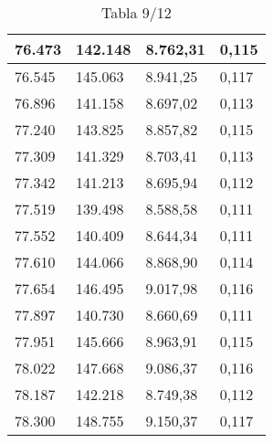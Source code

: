 \begin{table}[H]
{\begin{tabular}{| l | l | l |l |}
76.473	&	142.148	&	8.762,31	&	0,115	\\ \hline
76.545	&	145.063	&	8.941,25	&	0,117	\\ \hline
76.896	&	141.158	&	8.697,02	&	0,113	\\ \hline
77.240	&	143.825	&	8.857,82	&	0,115	\\ \hline
77.309	&	141.329	&	8.703,41	&	0,113	\\ \hline
77.342	&	141.213	&	8.695,94	&	0,112	\\ \hline
77.519	&	139.498	&	8.588,58	&	0,111	\\ \hline
77.552	&	140.409	&	8.644,34	&	0,111	\\ \hline
77.610	&	144.066	&	8.868,90	&	0,114	\\ \hline
77.654	&	146.495	&	9.017,98	&	0,116	\\ \hline
77.897	&	140.730	&	8.660,69	&	0,111	\\ \hline
77.951	&	145.666	&	8.963,91	&	0,115	\\ \hline
78.022	&	147.668	&	9.086,37	&	0,116	\\ \hline
78.187	&	142.218	&	8.749,38	&	0,112	\\ \hline
78.300	&	148.755	&	9.150,37	&	0,117	\\ \hline
  \end{tabular}
  \caption*{Tabla 9/12}
}
\end{table}
